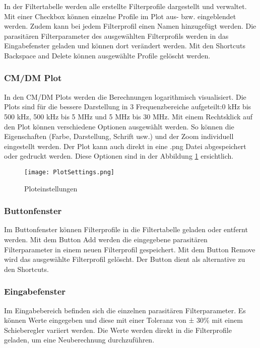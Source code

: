 In der Filtertabelle werden alle erstellte Filterprofile dargestellt und verwaltet. Mit einer Checkbox können einzelne Profile im Plot aus- bzw. eingeblendet werden. Zudem kann bei jedem Filterprofil einen Namen hinzugefügt werden. Die parasitären Filterparameter des ausgewählten Filterprofils werden in das Eingabefenster geladen und können dort verändert werden. Mit den Shortcuts Backspace and Delete können ausgewählte Profile gelöscht werden.

\subsubsection{CM/DM Plot} \label{subsubsec:CM_DMplot}

In den CM/DM Plots werden die Berechnungen logarithmisch visualisiert. Die Plots sind für die bessere Darstellung in 3 Frequenzbereiche aufgeteilt:0 kHz bis 500 kHz, 500 kHz bis 5 MHz und 5 MHz bis 30 MHz. Mit einem Rechtsklick auf den Plot können verschiedene Optionen ausgewählt werden. So können die Eigenschaften (Farbe, Darstellung, Schrift usw.) und der Zoom individuell eingestellt werden. Der Plot kann auch direkt in eine .png Datei abgespeichert oder gedruckt werden. Diese Optionen sind in der Abbildung \ref{fig:PlotSettings}  ersichtlich.

\begin{figure}[H]
	\centering
	\texttt{[image: PlotSettings.png]}
	\caption{Ploteinstellungen}
	\label{fig:PlotSettings}
\end{figure} 

\subsubsection{Buttonfenster} \label{subsubsec:buttonfenster}

Im Buttonfenster können Filterprofile in die Filtertabelle geladen oder entfernt werden. Mit dem Button Add werden die eingegebene parasitären Filterparameter in einem neuen Filterprofil gespeichert. Mit dem Button Remove wird das ausgewählte Filterprofil gelöscht. Der Button dient als alternative zu den Shortcuts.

\subsubsection{Eingabefenster} \label{subsubsec:eingabefenster}

Im Eingabebereich befinden sich die einzelnen parasitären Filterparameter. Es können Werte eingegeben und diese mit einer Toleranz von ± 30\% mit einem Schieberegler variiert werden. Die Werte werden direkt in die Filterprofile geladen, um eine Neuberechnung durchzuführen.

